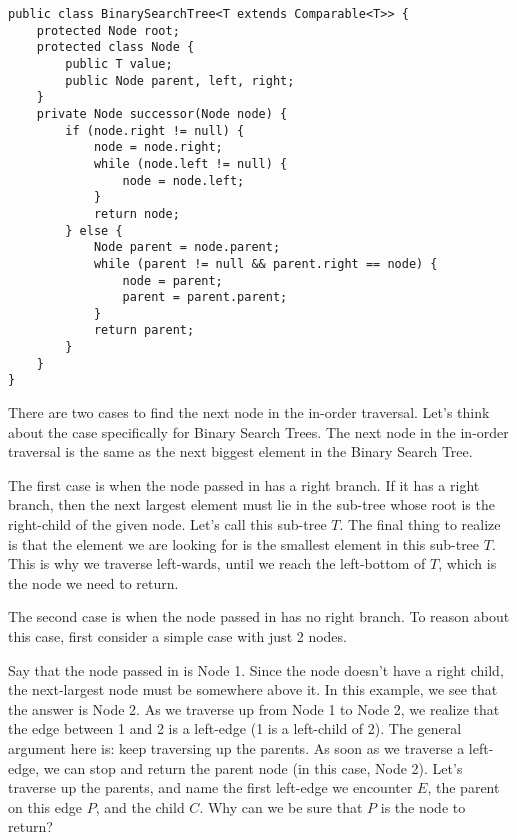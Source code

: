 \begin{solution}[2.5in]
\begin{lstlisting}
public class BinarySearchTree<T extends Comparable<T>> {
    protected Node root;
    protected class Node {
        public T value;
        public Node parent, left, right;
    }
    private Node successor(Node node) {
        if (node.right != null) {
            node = node.right;
            while (node.left != null) {
                node = node.left;
            }
            return node;
        } else {
            Node parent = node.parent;
            while (parent != null && parent.right == node) {
                node = parent;
                parent = parent.parent;
            }
            return parent;
        }
    }
}
\end{lstlisting}

There are two cases to find the next node in the in-order traversal. Let's
think about the case specifically for Binary Search Trees. The next node in the
in-order traversal is the same as the next biggest element in the Binary Search
Tree.

The first case is when the node passed in has a right branch. If it has a right
branch, then the next largest element must lie in the sub-tree whose root is
the right-child of the given node. Let's call this sub-tree $T$. The final
thing to realize is that the element we are looking for is the smallest element
in this sub-tree $T$. This is why we traverse left-wards, until we reach the
left-bottom of $T$, which is the node we need to return.

The second case is when the node passed in has no right branch. To reason about
this case, first consider a simple case with just 2 nodes.

\begin{center}
\end{center}

Say that the node passed in is Node 1. Since the node doesn't have a right
child, the next-largest node must be somewhere above it. In this example, we
see that the answer is Node 2. As we traverse up from Node 1 to Node 2, we
realize that the edge between 1 and 2 is a left-edge (1 is a left-child of 2).
The general argument here is: keep traversing up the parents. As soon as we
traverse a left-edge, we can stop and return the parent node (in this case,
Node 2). Let's traverse up the parents, and name the first left-edge we
encounter $E$, the parent on this edge $P$, and the child $C$. Why can we be
sure that $P$ is the node to return?


\end{solution}
